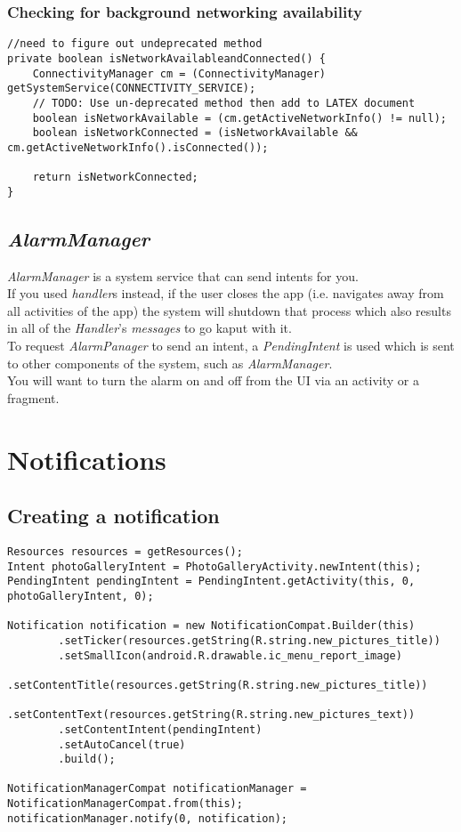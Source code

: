 \documentclass[]{article}
\renewcommand{\it}[1]{\textit{#1}}
\begin{document}
\subsubsection{Checking for background networking availability}
\begin{lstlisting}
//need to figure out undeprecated method
private boolean isNetworkAvailableandConnected() {
	ConnectivityManager cm = (ConnectivityManager) getSystemService(CONNECTIVITY_SERVICE);
	// TODO: Use un-deprecated method then add to LATEX document
	boolean isNetworkAvailable = (cm.getActiveNetworkInfo() != null);
	boolean isNetworkConnected = (isNetworkAvailable && cm.getActiveNetworkInfo().isConnected());
	
	return isNetworkConnected;
}
\end{lstlisting}

\subsection{\it{AlarmManager}}
\it{AlarmManager} is a system service that can send intents for you.
\\
If you used \it{handler}s instead, if the user closes the app (i.e. navigates away from all activities of the app) the system will shutdown that process which also results in all of the \it{Handler}'s \it{messages} to go kaput with it.
\\
To request \it{AlarmPanager} to send an intent, a \it{PendingIntent} is used which is sent to other components of the system, such as \it{AlarmManager}. 
\\
You will want to turn the alarm on and off from the UI via an activity or a fragment.

\section{Notifications}
\subsection{Creating a notification}
\begin{lstlisting}
Resources resources = getResources();
Intent photoGalleryIntent = PhotoGalleryActivity.newIntent(this);
PendingIntent pendingIntent = PendingIntent.getActivity(this, 0, photoGalleryIntent, 0);

Notification notification = new NotificationCompat.Builder(this)
		.setTicker(resources.getString(R.string.new_pictures_title))
		.setSmallIcon(android.R.drawable.ic_menu_report_image)
		.setContentTitle(resources.getString(R.string.new_pictures_title))
		.setContentText(resources.getString(R.string.new_pictures_text))
		.setContentIntent(pendingIntent)
		.setAutoCancel(true)
		.build();

NotificationManagerCompat notificationManager = NotificationManagerCompat.from(this);
notificationManager.notify(0, notification);
\end{lstlisting}
\end{document}
